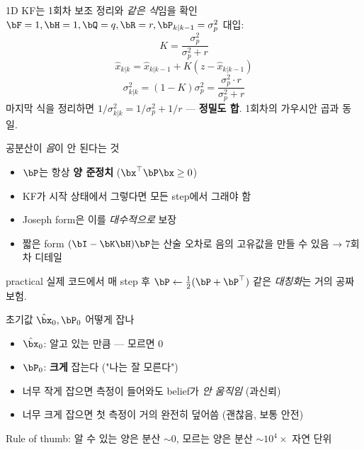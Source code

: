 \begin{frame}{1D KF는 1회차 보조 정리와 \emph{같은 식}임을 확인}
  $\bF=1, \bH=1, \bQ=q, \bR=r, \bP_{k|k-1}=\sigma_p^2$ 대입:
  \[
    K = \frac{\sigma_p^2}{\sigma_p^2 + r}
  \]
  \[
    \hat x_{k|k} = \hat x_{k|k-1} + K(z - \hat x_{k|k-1})
  \]
  \[
    \sigma_{k|k}^2 = (1-K)\sigma_p^2 = \frac{\sigma_p^2 \cdot r}{\sigma_p^2 + r}
  \]
  \pause
  \vspace{0.3em}
  마지막 식을 정리하면 $1/\sigma_{k|k}^2 = 1/\sigma_p^2 + 1/r$ — \textbf{정밀도 합}. 1회차의 가우시안 곱과 동일.
\end{frame}

\begin{frame}{공분산이 \emph{음}이 안 된다는 것}
  \begin{itemize}
    \item $\bP$는 항상 \textbf{양 준정치} ($\bx^\top \bP \bx \geq 0$)
    \item KF가 시작 상태에서 그렇다면 모든 step에서 그래야 함
    \item Joseph form은 이를 \emph{대수적으로} 보장
    \item 짧은 form $(\bI-\bK\bH)\bP$는 산술 오차로 음의 고유값을 만들 수 있음 → 7회차 디테일
  \end{itemize}
  \pause
  \vspace{0.3em}
  \begin{block}{practical}
    실제 코드에서 매 step 후 $\bP \leftarrow \frac{1}{2}(\bP + \bP^\top)$ 같은 \emph{대칭화}는 거의 공짜 보험.
  \end{block}
\end{frame}

\begin{frame}{초기값 $\hat\bx_0, \bP_0$ 어떻게 잡나}
  \begin{itemize}
    \item $\hat\bx_0$: 알고 있는 만큼 — 모르면 0
    \item $\bP_0$: \textbf{크게} 잡는다 ("나는 잘 모른다")
    \item 너무 작게 잡으면 측정이 들어와도 belief가 \emph{안 움직임} (과신뢰)
    \item 너무 크게 잡으면 첫 측정이 거의 완전히 덮어씀 (괜찮음, 보통 안전)
  \end{itemize}
  \pause
  \vspace{0.3em}
  Rule of thumb: 알 수 있는 양은 분산 $\sim 0$, 모르는 양은 분산 $\sim 10^4 \times$ 자연 단위
\end{frame}


